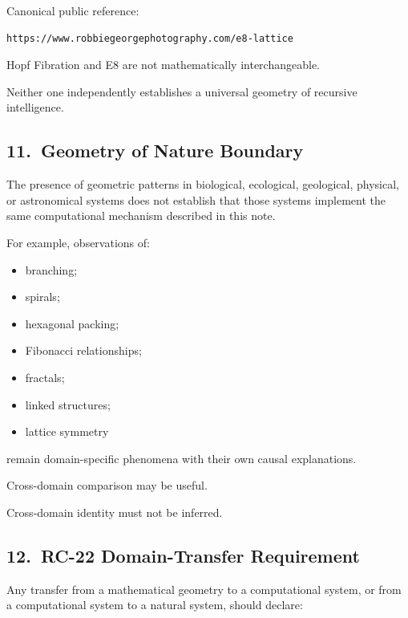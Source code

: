Canonical public reference:

\begin{verbatim}
https://www.robbiegeorgephotography.com/e8-lattice
\end{verbatim}

Hopf Fibration and E8 are not mathematically interchangeable.

Neither one independently establishes a universal geometry of recursive
intelligence.

\subsection*{11.\ Geometry of Nature Boundary}

The presence of geometric patterns in biological, ecological, geological,
physical, or astronomical systems does not establish that those systems
implement the same computational mechanism described in this note.

For example, observations of:

\begin{itemize}
    \item branching;
    \item spirals;
    \item hexagonal packing;
    \item Fibonacci relationships;
    \item fractals;
    \item linked structures;
    \item lattice symmetry
\end{itemize}

remain domain-specific phenomena with their own causal explanations.

Cross-domain comparison may be useful.

Cross-domain identity must not be inferred.

\subsection*{12.\ RC-22 Domain-Transfer Requirement}

Any transfer from a mathematical geometry to a computational system, or from
a computational system to a natural system, should declare:

